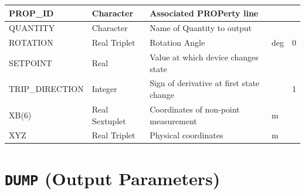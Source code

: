 \documentclass[11pt]{book}
\begin{document}
\begin{table}[H]
\begin{tabular*}{\textwidth}{@{\extracolsep{\fill}}|l|l|l|l|l|}
{\ct PROP\_ID}         & Character       & Associated {\ct PROP}erty line                                   &       &         \\ \hline
{\ct QUANTITY}         & Character       & Name of Quantity to output                                       &       &         \\ \hline
{\ct ROTATION}         & Real Triplet    & Rotation Angle                                                   & deg   & 0       \\ \hline
{\ct SETPOINT}         & Real            & Value at which device changes state                              &       &         \\ \hline
{\ct TRIP\_DIRECTION}  & Integer         & Sign of derivative at first state change                         &       &  1      \\ \hline
{\ct XB(6)}            & Real Sextuplet  & Coordinates of non-point measurement                             & m     &         \\ \hline
{\ct XYZ}              & Real Triplet    & Physical coordinates                                             & m     &         \\ \hline
\end{tabular*}
\normalsize
\end{table}

\vspace{\baselineskip}

\vfill


\section{\texorpdfstring{{\tt DUMP}}{DUMP} (Output Parameters)}

\hspace{1in}
\end{document}
